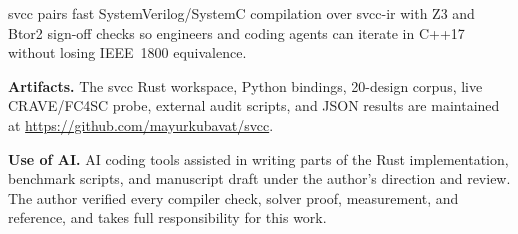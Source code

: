 \documentclass[conference]{IEEEtran}
\newcommand{\code}[1]{{\fontshape{n}\ttfamily #1}}
\begin{document}
\code{svcc} pairs fast SystemVerilog/SystemC compilation over \code{svcc-ir} with Z3 and Btor2 sign-off checks so engineers and coding agents can iterate in C++17 without losing IEEE~1800 equivalence.

\textbf{Artifacts.} The \code{svcc} Rust workspace, Python bindings, 20-design corpus, live CRAVE/FC4SC probe, external audit scripts, and JSON results are maintained at \url{https://github.com/mayurkubavat/svcc}.

\textbf{Use of AI.} AI coding tools assisted in writing parts of the Rust implementation, benchmark scripts, and manuscript draft under the author's direction and review. The author verified every compiler check, solver proof, measurement, and reference, and takes full responsibility for this work.



\end{document}
